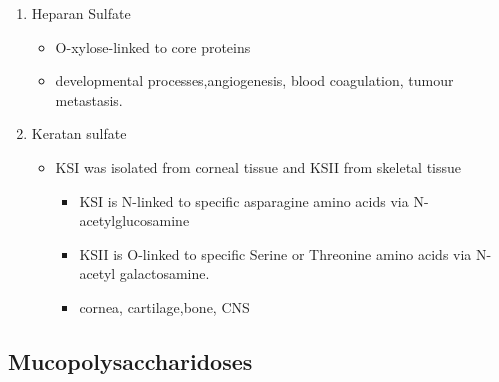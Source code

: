 \documentclass{scrartcl}
\begin{document}
\begin{enumerate}
\begin{enumerate}
\item Heparan Sulfate
\label{sec:orga3b9e36}
\begin{itemize}
\item O-xylose-linked to core proteins
\item developmental processes,angiogenesis, blood coagulation, tumour metastasis.
\end{itemize}

\item Keratan sulfate
\label{sec:orgc6bd83d}
\begin{itemize}
\item KSI was isolated from corneal tissue and KSII from skeletal tissue
\begin{itemize}
\item KSI is N-linked to specific asparagine amino acids via
N-acetylglucosamine
\item KSII is O-linked to specific Serine or Threonine amino acids via
N-acetyl galactosamine.
\item cornea, cartilage,bone, CNS
\end{itemize}
\end{itemize}
\end{enumerate}
\end{enumerate}


\subsection{Mucopolysaccharidoses}
\label{sec:orgac04491}
\end{document}
